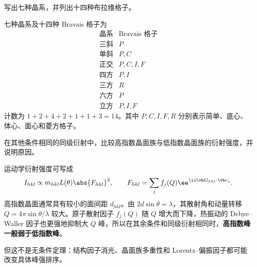 \begin{question}[6 分]
写出七种晶系，并列出十四种布拉维格子。


\begin{solution}
七种晶系及十四种 Bravais 格子为
\[
\begin{array}{c|l}
\text{晶系}&\text{Bravais 格子}\\ \hline
\text{三斜}&P\\
\text{单斜}&P,C\\
\text{正交}&P,C,I,F\\
\text{四方}&P,I\\
\text{三方}&R\\
\text{六方}&P\\
\text{立方}&P,I,F
\end{array}
\]
计数为 $1+2+4+2+1+1+3=14$。其中 $P,C,I,F,R$ 分别表示简单、底心、体心、面心和菱方格子。
\end{solution}
\end{question}

\begin{question}[6 分]
在其他条件相同的同级衍射中，比较高指数晶面族与低指数晶面族的衍射强度，并说明原因。


\begin{solution}
运动学衍射强度可写成
\[
 I_{hkl}\propto m_{hkl}L(\theta)\abs{F_{hkl}}^2,
 \qquad
 F_{hkl}=\sum_j f_j(Q)\ee^{\ii\vb G_{hkl}\cdot\vb r_j}.
\]
高指数晶面通常具有较小的面间距 $d_{hkl}$。由 $2d\sin\theta=\lambda$，其散射角和动量转移 $Q=4\pi\sin\theta/\lambda$ 较大。原子散射因子 $f_j(Q)$ 随 $Q$ 增大而下降，热振动的 Debye--Waller 因子也更强地抑制大 $Q$ 峰，所以在其余条件和同级衍射相同时，\textbf{高指数峰一般弱于低指数峰}。

但这不是无条件定理：结构因子消光、晶面族多重性和 Lorentz--偏振因子都可能改变具体峰强排序。
\end{solution}
\end{question}

